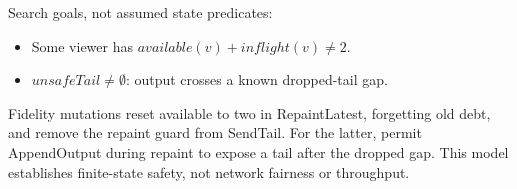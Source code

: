 \documentclass[a4paper,10pt]{article}
\begin{document}
Search goals, not assumed state predicates:
\begin{itemize}
\item Some viewer has $available(v)+inflight(v) \neq 2$.
\item $unsafeTail \neq \emptyset$: output crosses a known dropped-tail gap.
\end{itemize}
Fidelity mutations reset available to two in RepaintLatest, forgetting old
debt, and remove the repaint guard from SendTail. For the latter, permit
AppendOutput during repaint to expose a tail after the dropped gap.
This model establishes finite-state safety, not network fairness or throughput.
\end{document}
